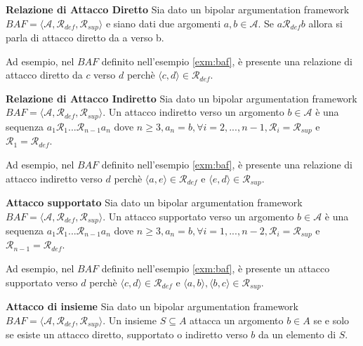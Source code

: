 \bigskip
\begin{defn} \textbf{Relazione di Attacco Diretto} 
Sia dato un bipolar argumentation framework $BAF = ⟨\mathcal{A}, \mathcal{R}_{def}, \mathcal{R}_{sup}⟩$ e siano dati due argomenti $a, b ∈ \mathcal{A}$. Se $ a \mathcal{R}_{def} b$ allora si parla di attacco diretto da a verso b.
\label{defn:adbaf}
\end{defn}

Ad esempio, nel $BAF$ definito nell'esempio \ref{exm:baf}, è presente una relazione di attacco diretto da $c$ verso $d$ perchè $⟨c, d⟩ ∈ \mathcal{R}_{def}$.


\bigskip
\begin{defn} \textbf{Relazione di Attacco Indiretto} 
Sia dato un bipolar argumentation framework $BAF = ⟨\mathcal{A}, \mathcal{R}_{def}, \mathcal{R}_{sup}⟩$. Un attacco indiretto verso un argomento $b ∈ \mathcal{A}$ è una sequenza $a_{1}\mathcal{R}_{1}...\mathcal{R}_{n-1}a_{n}$ dove $n \geq 3, a_n = b, \forall i = 2, ..., n-1, \mathcal{R}_i = \mathcal{R}_{sup}$ e $ \mathcal{R}_{1} = \mathcal{R}_{def}$.
\label{defn:aibaf}
\end{defn}

Ad esempio, nel $BAF$ definito nell'esempio \ref{exm:baf}, è presente una relazione di attacco indiretto verso $d$ perchè $⟨a, e⟩ ∈ \mathcal{R}_{def}$ e $⟨e, d⟩ ∈ \mathcal{R}_{sup}$.


\bigskip
\begin{defn} \textbf{Attacco supportato} 
Sia dato un bipolar argumentation framework $BAF = ⟨\mathcal{A}, \mathcal{R}_{def}, \mathcal{R}_{sup}⟩$. Un attacco supportato verso un argomento $b ∈ \mathcal{A}$ è una sequenza $a_{1}\mathcal{R}_{1}...\mathcal{R}_{n-1}a_{n}$ dove $n \geq 3, a_n = b, \forall i = 1, ..., n-2, \mathcal{R}_i = \mathcal{R}_{sup}$ e $ \mathcal{R}_{n-1} = \mathcal{R}_{def}$.
\label{defn:asbaf}
\end{defn}

Ad esempio, nel $BAF$ definito nell'esempio \ref{exm:baf}, è presente un attacco supportato verso $d$ perchè $⟨c, d⟩ ∈ \mathcal{R}_{def}$ e $⟨a, b⟩, ⟨b, c⟩ ∈ \mathcal{R}_{sup}$.


\bigskip
\begin{defn} \textbf{Attacco di insieme} 
Sia dato un bipolar argumentation framework $BAF = ⟨\mathcal{A}, \mathcal{R}_{def}, \mathcal{R}_{sup}⟩$. Un insieme $S \subseteq A$ attacca un argomento $b \in A$ se e solo se esiste un attacco diretto, supportato o indiretto verso $b$ da un elemento di $S$.
\label{defn:adibaf}
\end{defn}

